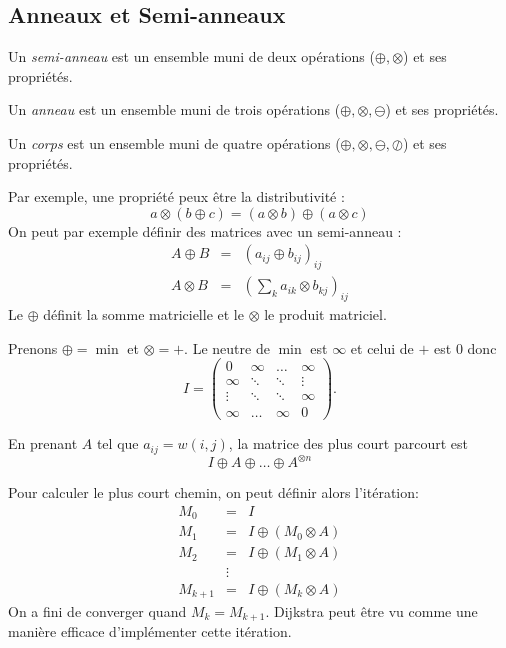 \subsection{Anneaux et Semi-anneaux}
\begin{mydef}
  Un \emph{semi-anneau} est un ensemble muni de deux opérations ($\oplus,\otimes$) et ses propriétés.
\end{mydef}

\begin{mydef}
  Un \emph{anneau} est un ensemble muni de trois opérations ($\oplus,\otimes,\ominus$) et ses propriétés.
\end{mydef}

\begin{mydef}
  Un \emph{corps} est un ensemble muni de quatre opérations ($\oplus,\otimes,\ominus,\oslash$) et ses propriétés.
\end{mydef}

Par exemple, une propriété peux être la distributivité :
$$a\otimes (b \oplus c) = (a \otimes b)\oplus(a \otimes c) $$
On peut par exemple définir des matrices avec un semi-anneau :
\begin{eqnarray}
  A \oplus B &=& (a_{ij} \oplus b_{ij})_{ij}\\
  A \otimes B &=& (\sum_k a_{ik} \otimes b_{kj})_{ij}
\end{eqnarray}
Le $\oplus$ définit la somme matricielle et le $\otimes$ le produit matriciel.

Prenons $\oplus = \min$ et $\otimes = +$.
Le neutre de $\min$ est $\infty$ et celui de $+$ est $0$ donc
\[ I =
  \begin{pmatrix}
    0 & \infty & \ldots & \infty\\
    \infty & \ddots & \ddots & \vdots\\
    \vdots & \ddots & \ddots & \infty\\
    \infty & \ldots & \infty & 0
  \end{pmatrix}.
\]

En prenant $A$ tel que $a_{ij} = w(i, j)$, la matrice des plus court parcourt est
\[ I \oplus A \oplus \ldots \oplus A^{\otimes n} \]

Pour calculer le plus court chemin, on peut définir alors l'itération:
\begin{eqnarray}
  M_0 &=& I\\
  M_1 &=& I \oplus (M_0 \otimes A)\\
  M_2 &=& I \oplus (M_1 \otimes A)\\
   & \vdots &\\
  M_{k+1} &=& I \oplus (M_k \otimes A)
\end{eqnarray}
On a fini de converger quand $M_k = M_{k+1}$. Dijkstra peut être vu comme une manière efficace d'implémenter cette itération.
